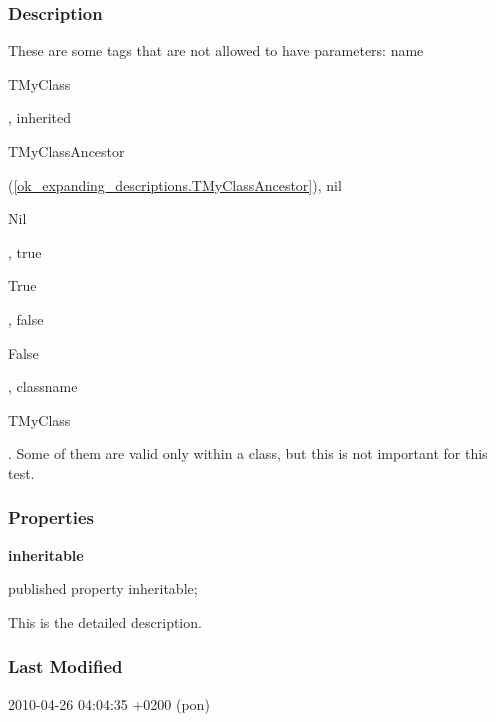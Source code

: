 \documentclass{report}
\newif\ifpdf
\begin{document}
\subsubsection*{\large{\textbf{Description}}\normalsize\hspace{1ex}\hfill}
These are some tags that are not allowed to have parameters: name \begin{ttfamily}TMyClass\end{ttfamily}, inherited \begin{ttfamily}TMyClassAncestor\end{ttfamily}(\ref{ok_expanding_descriptions.TMyClassAncestor}), nil \begin{ttfamily}Nil\end{ttfamily}, true \begin{ttfamily}True\end{ttfamily}, false \begin{ttfamily}False\end{ttfamily}, classname \begin{ttfamily}TMyClass\end{ttfamily}. Some of them are valid only within a class, but this is not important for this test.

\subsubsection*{\large{\textbf{Properties}}\normalsize\hspace{1ex}\hfill}
\begin{list}{}{
\setlength{\itemindent}{0cm}
\setlength{\listparindent}{0cm}
\setlength{\leftmargin}{\evensidemargin}
\addtolength{\leftmargin}{\tmplength}
\settowidth{\labelsep}{X}
\addtolength{\leftmargin}{\labelsep}
\setlength{\labelwidth}{\tmplength}
}
\label{ok_expanding_descriptions.TMyClass-inheritable}
\item[\textbf{inheritable}\hfill]
\ifpdf
\begin{flushleft}
\fi
\begin{ttfamily}
published property inheritable;\end{ttfamily}

\ifpdf
\end{flushleft}
\fi


\par This is the detailed description.\end{list}
\subsubsection*{\large{\textbf{Last Modified}}\normalsize\hspace{1ex}\hfill}
\par
2010-04-26 04:04:35 +0200 (pon)
\end{document}
